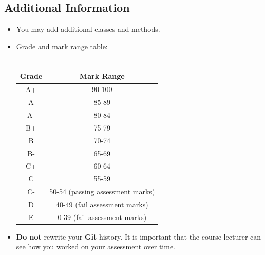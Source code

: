 \documentclass{article}
\begin{document}
\subsection*{Additional Information}
\begin{itemize}
    \item You may add additional classes and methods. 
    \item Grade and mark range table:\\\\
    \renewcommand{\arraystretch}{1.5}
    \begin{tabular}{|c|c|}
        \hline
        \textbf{Grade} & \textbf{Mark Range} \\ \hline
        A+ & 90-100  \\ \hline
        A & 85-89  \\ \hline
        A- & 80-84 \\ \hline
        B+ & 75-79   \\ \hline
        B & 70-74  \\ \hline
        B- & 65-69  \\ \hline
        C+ & 60-64  \\ \hline
        C & 55-59 \\ \hline
        C- & 50-54 (passing assessment marks)  \\ \hline
        D & 40-49 (fail assessment marks)   \\ \hline
        E & 0-39 (fail assessment marks)   \\ \hline
    \end{tabular}
    \item \textbf{Do not} rewrite your \textbf{Git} history. It is important that the course lecturer can see how you worked on your assessment over time.
\end{itemize}
\end{document}
